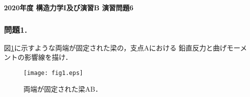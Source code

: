 \documentclass[10pt,a4j]{jarticle}
\newlength{\minitwocolumn}
\begin{document}
\newcommand{\fat}[1]{\mbox{\boldmath $#1$}}
\newcommand{\D}{\partial}
\newcommand{\w}{\omega}
\newcommand{\ga}{\alpha}
\newcommand{\gb}{\beta}
\newcommand{\gx}{\xi}
\newcommand{\gz}{\zeta}
\newcommand{\vhat}[1]{\hat{\fat{#1}}}
\newcommand{\spc}{\vspace{0.7\baselineskip}}
\newcommand{\halfspc}{\vspace{0.3\baselineskip}}

\pagestyle{empty}
\newcommand{\twofig}[2]
 {
   \begin{figure}[h]
     \begin{minipage}[t]{\minitwocolumn}
         \begin{center}   #1
         \end{center}
     \end{minipage}
         \hspace{\columnsep}
     \begin{minipage}[t]{\minitwocolumn}
         \begin{center} #2
         \end{center}
     \end{minipage}
   \end{figure}
 }
\begin{center}
{\Large \bf 2020年度 構造力学I及び演習B 演習問題6} \\
\end{center}
\subsubsection*{問題1.}
図\ref{fig:fig1}に示すような両端が固定された梁の，支点Aにおける
鉛直反力と曲げモーメントの影響線を描け．
\begin{figure}[h]
	\begin{center}
	\texttt{[image: fig1.eps]} 
	\end{center}
	\caption{両端が固定された梁AB．} 
	\label{fig:fig1}
\end{figure}
%
\end{document}
